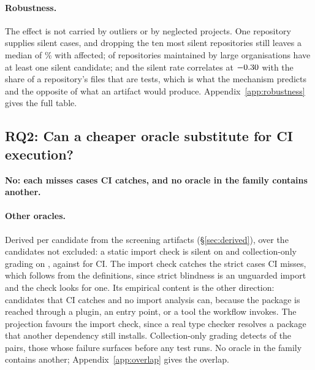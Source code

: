 \documentclass[11pt]{article}
\begin{document}
\paragraph{Robustness.}
The effect is not carried by outliers or by neglected projects.
One repository supplies \nSwirlSilent{} silent cases, and dropping the ten most silent repositories still leaves a median of \dropTenMedian\% with \dropTenIncidence{} affected; \nMajorAffected{} of \nMajor{} repositories maintained by large organisations have at least one silent candidate; and the silent rate correlates at $-0.30$ with the share of a repository's files that are tests, which is what the mechanism predicts and the opposite of what an artifact would produce.
Appendix~\ref{app:robustness} gives the full table.

\subsection{RQ2: Can a cheaper oracle substitute for CI execution?}
\label{sec:rq2}

\textbf{No: each misses cases CI catches, and no oracle in the family contains another.}

\paragraph{Other oracles.}
Derived per candidate from the screening artifacts (\S\ref{sec:derived}), over the \nScreenedRule{} candidates not excluded: a static import check is silent on \nImportSilent{} and collection-only grading on \nCollectionSilent{}, against \nSilent{} for CI.
The import check catches the \nImportCatchesCIMisses{} strict cases CI misses, which follows from the definitions, since strict blindness is an unguarded import and the check looks for one.
Its empirical content is the other direction: \nCIcatchesImportMisses{} candidates that CI catches and no import analysis can, because the package is reached through a plugin, an entry point, or a tool the workflow invokes.
The projection favours the import check, since a real type checker resolves a package that another dependency still installs.
Collection-only grading detects \nCollectionCatches{} of the \nPairs{} pairs, those whose failure surfaces before any test runs.
No oracle in the family contains another; Appendix~\ref{app:overlap} gives the overlap.
\end{document}
